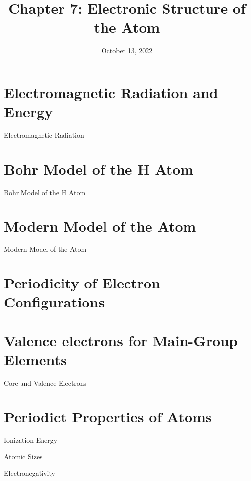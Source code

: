 \documentclass[11pt]{beamer}
\title{Chapter 7: Electronic Structure of the Atom}
\institute{Chemistry Department, Cypress College}
\date{October 13, 2022}
\begin{document}
\begin{frame}
  \titlepage
\end{frame}

\section{Electromagnetic Radiation and Energy}

\begin{frame}{Electromagnetic Radiation}
\end{frame}

\section{Bohr Model of the H Atom}

\begin{frame}{Bohr Model of the H Atom}
\end{frame}

\section{Modern Model of the Atom}

\begin{frame}{Modern Model of the Atom}
\end{frame}

\section{Periodicity of Electron Configurations}

\begin{frame}{}
\end{frame}

\section{Valence electrons for Main-Group Elements}

\begin{frame}{Core and Valence Electrons}
\end{frame}

\section{Periodict Properties of Atoms}

\begin{frame}{Ionization Energy}
\end{frame}

\begin{frame}{Atomic Sizes}
\end{frame}

\begin{frame}{Electronegativity}
\end{frame}
\end{document}

